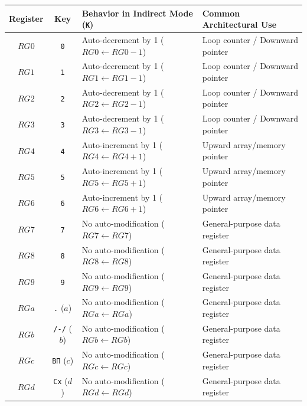 \documentclass[11pt,a4paper]{article}
\begin{document}
\begin{center}
\small
\begin{tabular}{ccp{7.2cm}p{4.6cm}}
\toprule
\textbf{Register} & \textbf{Key} & \textbf{Behavior in Indirect Mode (\texttt{K})} & \textbf{Common Architectural Use} \\
\midrule
$RG0$ & \texttt{0}       & Auto-decrement by 1 ($RG0 \leftarrow RG0 - 1$) & Loop counter / Downward pointer \\
$RG1$ & \texttt{1}       & Auto-decrement by 1 ($RG1 \leftarrow RG1 - 1$) & Loop counter / Downward pointer \\
$RG2$ & \texttt{2}       & Auto-decrement by 1 ($RG2 \leftarrow RG2 - 1$) & Loop counter / Downward pointer \\
$RG3$ & \texttt{3}       & Auto-decrement by 1 ($RG3 \leftarrow RG3 - 1$) & Loop counter / Downward pointer \\
\midrule
$RG4$ & \texttt{4}       & Auto-increment by 1 ($RG4 \leftarrow RG4 + 1$) & Upward array/memory pointer \\
$RG5$ & \texttt{5}       & Auto-increment by 1 ($RG5 \leftarrow RG5 + 1$) & Upward array/memory pointer \\
$RG6$ & \texttt{6}       & Auto-increment by 1 ($RG6 \leftarrow RG6 + 1$) & Upward array/memory pointer \\
\midrule
$RG7$ & \texttt{7}       & No auto-modification ($RG7 \leftarrow RG7$) & General-purpose data register \\
$RG8$ & \texttt{8}       & No auto-modification ($RG8 \leftarrow RG8$) & General-purpose data register \\
$RG9$ & \texttt{9}       & No auto-modification ($RG9 \leftarrow RG9$) & General-purpose data register \\
$RGa$ & \texttt{.} ($a$) & No auto-modification ($RGa \leftarrow RGa$) & General-purpose data register \\
$RGb$ & \texttt{/-/} ($b$)& No auto-modification ($RGb \leftarrow RGb$) & General-purpose data register \\
$RGc$ & \texttt{ВП} ($c$)& No auto-modification ($RGc \leftarrow RGc$) & General-purpose data register \\
$RGd$ & \texttt{Сх} ($d$)& No auto-modification ($RGd \leftarrow RGd$) & General-purpose data register \\
\bottomrule
\end{tabular}
\end{center}
\end{document}

